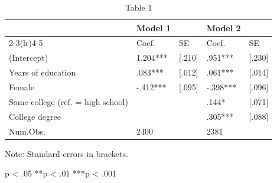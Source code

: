 \begin{table}[!t]
\centering
\caption{Table 1}
\begin{threeparttable}
\begin{tabular}{lllll}
\toprule
& Model 1 &  & Model 2 &  \\ \cmidrule(lr){2-3}\cmidrule(lr){4-5}
& Coef. & SE & Coef. & SE \\ \midrule
(Intercept) & 1.204*** & [.210] & .951*** & [.230] \\
Years of education & .083*** & [.012] & .061*** & [.014] \\
Female & -.412*** & [.095] & -.398*** & [.096] \\
Some college (ref. = high school) &  &  & .144* & [.071] \\
College degree &  &  & .305*** & [.088] \\
Num.Obs. & 2400 &  & 2381 &  \\
\bottomrule
\end{tabular}
\begin{tablenotes}[flushleft]\footnotesize
\item Note: Standard errors in brackets.
\item *p < .05  **p < .01  ***p < .001
\end{tablenotes}
\end{threeparttable}
\end{table}

